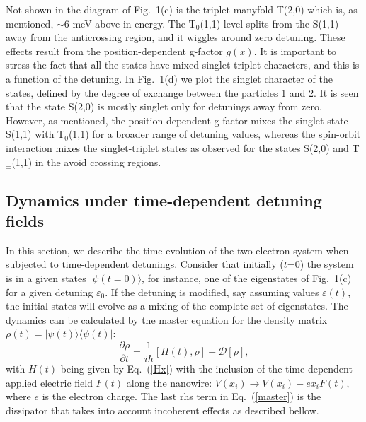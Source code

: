 \documentclass[prb,twocolumn,showpacs,floats]{revtex4}
\begin{document}
Not shown in the diagram of Fig.~1(c) is the triplet manyfold T(2,0) which is,
 as mentioned, $\sim$6 meV above in energy.\cite{comment-triplet20}
The T$_0$(1,1) level 
splits from the S(1,1) away from the anticrossing region, and it wiggles around zero detuning. These effects
result from the position-dependent g-factor $g(x)$.
It is important to stress the fact that all the states have mixed singlet-triplet characters, and this is a function of the detuning.
In Fig.~1(d) we plot the singlet character of the states, defined by the degree of exchange between the particles 1 and 2.
It is seen that the state S(2,0) is mostly singlet only for detunings away from zero.
However, as mentioned, the position-dependent g-factor mixes the singlet state S(1,1) with T$_0$(1,1) for
a broader range of detuning values, whereas the spin-orbit interaction mixes the singlet-triplet
states as observed for the states S(2,0) and T$_\pm$(1,1) in the avoid crossing regions.



\subsection{Dynamics under time-dependent detuning fields}

In this section, we describe the time evolution of the two-electron system
when subjected to time-dependent detunings.
Consider that initially ($t$=0) the system is in a given states $| \psi (t=0) \rangle$, for instance,
one of the eigenstates of Fig.~1(c) for a given detuning $\varepsilon_0$.
If the detuning is modified, say assuming values $\varepsilon (t)$, the initial states
will evolve as a mixing of the complete set of eigenstates. The dynamics
can be calculated by the master equation for the density matrix $\rho (t)= | \psi(t) \rangle 
\langle \psi (t) |$:
\begin{equation}
\frac{ \partial \rho}{\partial t} = \frac{1}{i \hbar} [ H(t), \rho ]+\mathcal{D} \left[\rho\right],
\label{master}
\end{equation}
with $H(t)$ being given by Eq.~(\ref{Hx}) with the inclusion of the time-dependent
applied electric field $F(t)$ along the nanowire: 
$V(x_i) \rightarrow V(x_i)  - e x_i F(t)$, where $e$ is the electron charge. The last rhs term in Eq.~(\ref{master}) is the dissipator that takes into account incoherent effects as described bellow.
\end{document}
